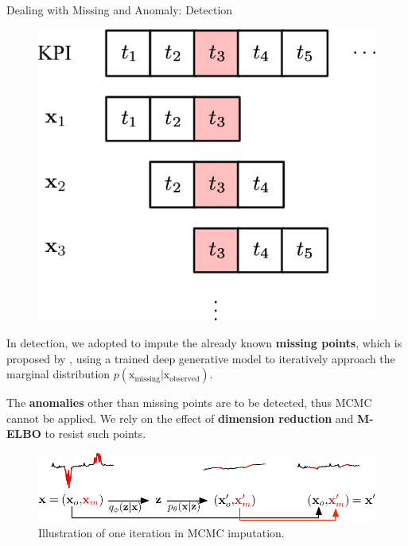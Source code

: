 \documentclass[usenames,dvipsnames]{beamer}
\newcommand{\emphasis}[1]{\textbf{\textcolor{emphcolor}{#1}}}
\newcommand{\vv}[1]{\bm{\mathrm{{#1}}}}
\begin{document}
\begin{frame}{Dealing with Missing and Anomaly: Detection}
  \begin{minipage}[t]{.3\linewidth}
    \begin{figure}
      \centering
      \includegraphics[height=.35\textheight]{sliding-windows-error}
    \end{figure}
  \end{minipage}\hfill
  \begin{minipage}[t]{.66\linewidth}
    In detection, we adopted  to impute the already known \emphasis{missing points}, which is proposed by \cite{rezende_stochastic_2014}, using a trained deep generative model to iteratively approach the marginal distribution $p(\vv{x}_{\text{missing}}|\vv{x}_{\text{observed}})$.\vspace{.5em}
    
    The \emphasis{anomalies} other than missing points are to be detected, thus MCMC cannot be applied.  We rely on the effect of \emphasis{dimension reduction} and \emphasis{M-ELBO} to resist such points.
  \end{minipage}
  
  \begin{figure}  
    \includegraphics[height=.25\textheight]{mcmc-illustration}
    \caption{Illustration of one iteration in MCMC imputation.}
  \end{figure}
\end{frame}
\end{document}
